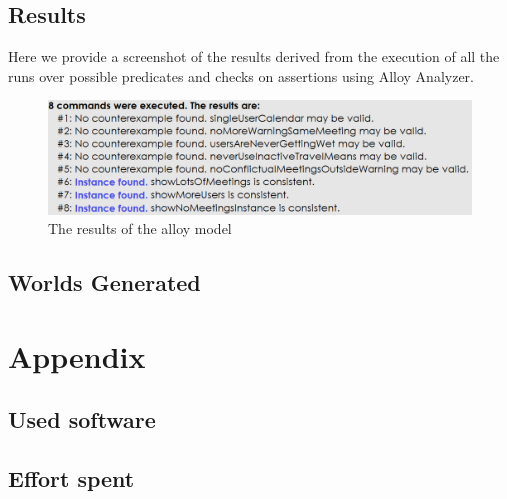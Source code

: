 \documentclass{article}
\begin{document}
\texttt{}	

\clearpage
\subsection{Results}
\begin{center}
Here we provide a screenshot of the results derived from the execution of all the runs over possible predicates and checks on assertions using Alloy Analyzer.
	\begin{figure}[htp] 

\includegraphics[width=\textwidth]{alloy/material/alloyresults} 
\caption{The results of the alloy model} 
\label{fig:alloyresults} 
\end{figure} 
\end{center}
\clearpage
\subsection{Worlds Generated}

\clearpage
\section{Appendix}

\subsection{Used software}


\subsection{Effort spent}
\end{document}

